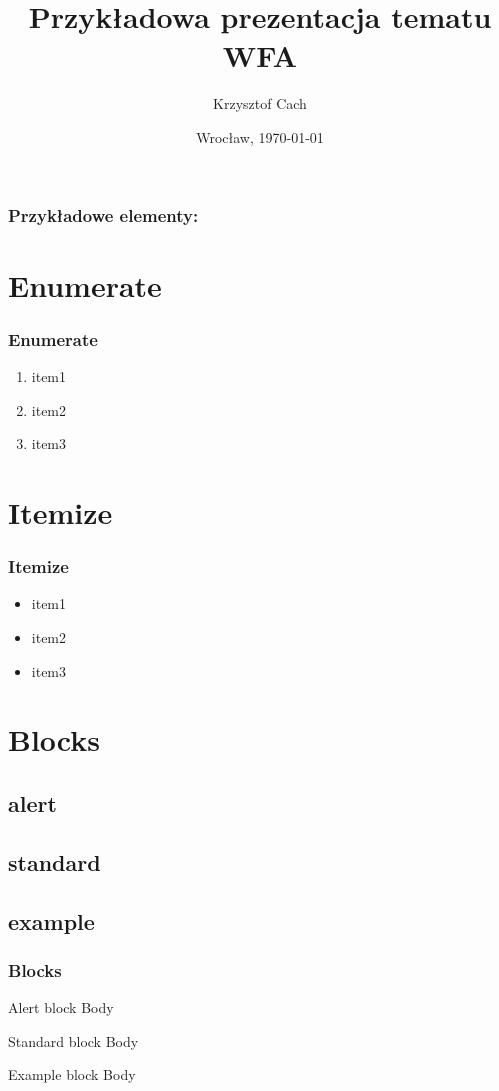 \documentclass{beamer}
\title{Przykładowa prezentacja tematu WFA}
\author{Krzysztof Cach}
\institute{Instytut fizyki teoretycznej}
\date{Wrocław, \today}
\begin{document}
\begin{frame}
	\titlepage{}
\end{frame}

\begin{frame}
\frametitle{Przykładowe elementy:}
\tableofcontents
\end{frame}

\section{Enumerate}
\begin{frame}
	\frametitle{Enumerate}
	\begin{enumerate}
	\item item1
	\item item2
	\item item3
	\end{enumerate}
\end{frame}

\section{Itemize}
\begin{frame}
	\frametitle{Itemize}
	\begin{itemize}
	\item item1
	\item item2
	\item item3
	\end{itemize}
\end{frame}

\section{Blocks}
\subsection{alert}
\subsection{standard}
\subsection{example}

\begin{frame}
	\frametitle{Blocks}
	\begin{alertblock}{Alert block}
		Body
	\end{alertblock}

	\begin{block}{Standard block}
		Body
	\end{block}

	\begin{exampleblock}{Example block}
		Body
	\end{exampleblock}
\end{frame}
\end{document}
